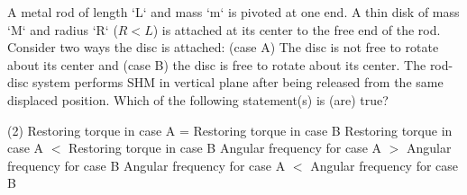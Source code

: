 
\item A metal rod of length `L` and mass `m` is pivoted at one end. A thin disk of mass `M` and radius `R` ($R < L$) is attached at its center to the free end of the rod. Consider two ways the disc is attached: (case A) The disc is not free to rotate about its center and (case B) the disc is free to rotate about its center. The rod-disc system performs SHM in vertical plane after being released from the same displaced position. Which of the following statement(s) is (are) true?
    \begin{center}
    \end{center}
    \begin{tasks}(2)
        \task Restoring torque in case A = Restoring torque in case B
        \task Restoring torque in case A $<$ Restoring torque in case B
        \task Angular frequency for case A $>$ Angular frequency for case B
        \task Angular frequency for case A $<$ Angular frequency for case B
    \end{tasks}
